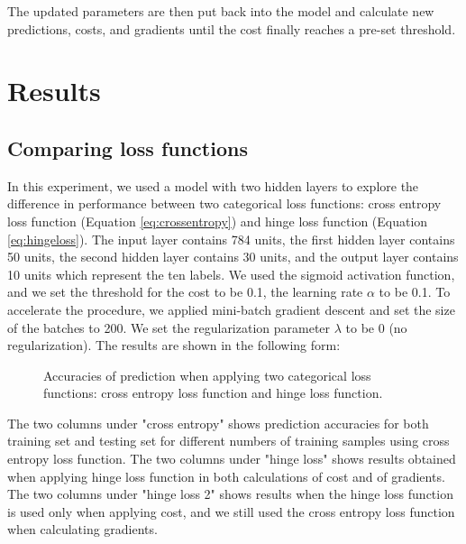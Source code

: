 \documentclass[UTF8,12pt]{article}
\begin{document}
	The updated parameters are then put back into the model and calculate new predictions, costs, and gradients until the cost finally reaches a pre-set threshold.

	\section{Results}
	\subsection{Comparing loss functions}
	In this experiment, we used a model with two hidden layers to explore the difference in performance between two categorical loss functions: cross entropy loss function (Equation \ref{eq:crossentropy}) and hinge loss function (Equation \ref{eq:hingeloss}). The input layer contains 784 units, the first hidden layer contains 50 units, the second hidden layer contains 30 units, and the output layer contains 10 units which represent the ten labels. We used the sigmoid activation function, and we set the threshold for the cost to be 0.1, the learning rate $\alpha$ to be 0.1. To accelerate the procedure, we applied mini-batch gradient descent and set the size of the batches to 200. We set the regularization parameter $\lambda$ to be 0 (no regularization). The results are shown in the following form:
	\begin{figure}[!ht]
		\centering
		\caption{\label{fig:lossfunc}Accuracies of prediction when applying two categorical loss functions: cross entropy loss function and hinge loss function.}
	\end{figure}
	
	The two columns under "cross entropy" shows prediction accuracies for both training set and testing set for different numbers of training samples using cross entropy loss function. The two columns under "hinge loss" shows results obtained when applying hinge loss function in both calculations of cost and of gradients. The two columns under "hinge loss 2" shows results when the hinge loss function is used only when applying cost, and we still used the cross entropy loss function when calculating gradients. 
	
\end{document}
